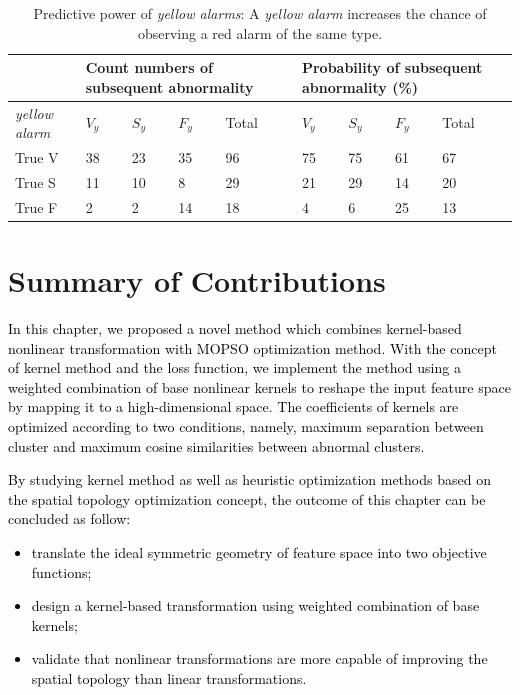 \begin{table}
	\caption{Predictive power of \textit{yellow alarms}: A \textit{yellow alarm} increases the chance of observing a red alarm of the same type.}
	\centering
	\begin{tabular}{|m{6em}| m{2em}| m{2em}| m{2em} |m{2em}| m{2em}| m{2em}| m{2em}| m{2em}|}
		\hline
		& \multicolumn{4}{p{10em}|}{Count numbers of subsequent abnormality} &\multicolumn{4}{p{10em}|}{Probability of subsequent abnormality (\%)}  \\ 
		\hline 
		\textit{\textit{yellow alarm}} & $V_y$ & $S_y$ & $F_y$ & Total & $V_y$ & $S_y$ & $F_y$ & Total \\ 
		\hline 
		True V & 38 & 23 & 35& 96 & 75 & 75 & 61 & 67 \\ 
		\hline 
		True S & 11 & 10 & 8 & 29 & 21 & 29 & 14& 20 \\ 
		\hline 
		True F & 2 & 2 & 14 & 18 & 4 & 6 & 25 & 13 \\ 
		\hline 
	\end{tabular}%
	\label{table:pred_kernel}
\end{table}


\section{Summary of Contributions} 

\textcolor{black}{In this chapter, we proposed a novel method which combines kernel-based nonlinear transformation with MOPSO optimization method. With the concept of kernel method and the loss function, we implement the method using a weighted combination of base nonlinear kernels to reshape the input feature space by mapping it to a high-dimensional space. The coefficients of kernels are optimized according to two conditions, namely, maximum separation between cluster and maximum cosine similarities between abnormal clusters.} \\
\textcolor{black}{By studying kernel method as well as heuristic optimization methods based on the spatial topology optimization concept, the outcome of this chapter can be concluded as follow:\\
\begin{itemize}
	\item translate the ideal symmetric geometry of feature space into two objective functions;
	\item design a kernel-based transformation using weighted combination of base kernels;
	\item validate that nonlinear transformations are more capable of improving the spatial topology than linear transformations.
\end{itemize}}

